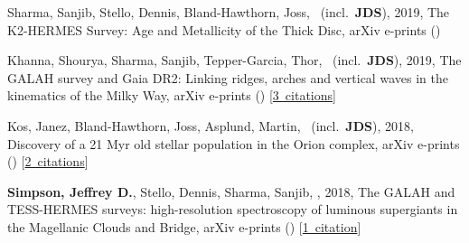 \item[{\color{numcolor}\scriptsize4}] Sharma, Sanjib, Stello, Dennis, Bland-Hawthorn, Joss, \etal\ (incl.\ \textbf{JDS}), 2019, The K2-HERMES Survey: Age and Metallicity of the Thick Disc, arXiv e-prints ()

\item[{\color{numcolor}\scriptsize3}] Khanna, Shourya, Sharma, Sanjib, Tepper-Garcia, Thor, \etal\ (incl.\ \textbf{JDS}), 2019, The GALAH survey and Gaia DR2: Linking ridges, arches and vertical waves in the kinematics of the Milky Way, arXiv e-prints () [\href{https://ui.adsabs.harvard.edu/#abs/2019arXiv190210113K}{3~citations}]

\item[{\color{numcolor}\scriptsize2}] Kos, Janez, Bland-Hawthorn, Joss, Asplund, Martin, \etal\ (incl.\ \textbf{JDS}), 2018, Discovery of a 21 Myr old stellar population in the Orion complex, arXiv e-prints () [\href{https://ui.adsabs.harvard.edu/#abs/2018arXiv181111762K}{2~citations}]

\item[{\color{numcolor}\scriptsize1}] \textbf{Simpson, Jeffrey D.}, Stello, Dennis, Sharma, Sanjib, \etal, 2018, The GALAH and TESS-HERMES surveys: high-resolution spectroscopy of luminous supergiants in the Magellanic Clouds and Bridge, arXiv e-prints () [\href{https://ui.adsabs.harvard.edu/#abs/2018arXiv180405900S}{1~citation}]